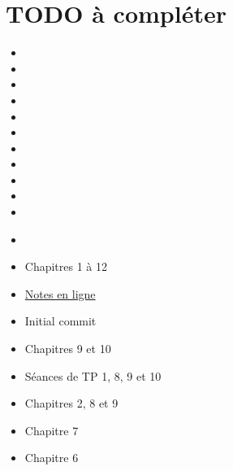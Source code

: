 \section{TODO à compléter \textcolor{red}{\danger}}
\begin{itemize}
  \item {}
  \item {}
  \item {}
  \item {}
  \item {}
  \item {}
  \item {}
  \item {}
  \item {}
  \item {}
  \item {}
  \item {}\\
\end{itemize}
\noindent
{}
  \begin{itemize}
    \item Chapitres 1 à 12
    \item \href{https://dl.dropboxusercontent.com/u/44092863/Graph_Theory_Romain_Capron.pdf}{Notes en ligne}     
  \end{itemize}
  \begin{itemize} 
    \item Initial commit
    \item Chapitres 9 et 10
    \item Séances de TP 1, 8, 9 et 10
  \end{itemize}
  \begin{itemize}
    \item Chapitres 2, 8 et 9
  \end{itemize}
  \begin{itemize}
    \item Chapitre 7
  \end{itemize}
  \begin{itemize}
    \item Chapitre 6
  \end{itemize}
